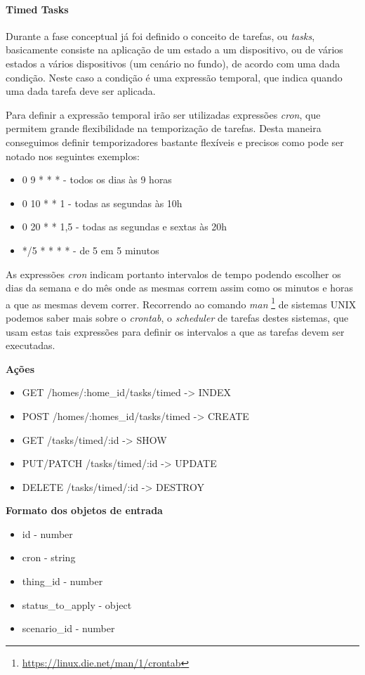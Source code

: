 \paragraph*{Timed Tasks}

Durante a fase conceptual já foi definido o conceito de tarefas, ou \textit{tasks}, basicamente consiste na aplicação de um estado a um dispositivo, ou de vários estados a vários dispositivos (um cenário no fundo), de acordo com uma dada condição. Neste caso a condição é uma expressão temporal, que indica quando uma dada tarefa deve ser aplicada.

Para definir a expressão temporal irão ser utilizadas expressões \textit{cron}, que permitem grande flexibilidade na temporização de tarefas. Desta maneira conseguimos definir temporizadores bastante flexíveis e precisos como pode ser notado nos seguintes exemplos:
\begin{itemize}
    \item 0 9 * * * - todos os dias às 9 horas
    \item 0 10 * * 1 - todas as segundas às 10h
    \item 0 20 * * 1,5 - todas as segundas e sextas às 20h
    \item */5 * * * * - de 5 em 5 minutos
\end{itemize}

As expressões \textit{cron} indicam portanto intervalos de tempo podendo escolher os dias da semana e do mês onde as mesmas correm assim como os minutos e horas a que as mesmas devem correr. Recorrendo ao comando \textit{man} \footnote{\url{https://linux.die.net/man/1/crontab}} de sistemas UNIX podemos saber mais sobre o \textit{crontab}, o \textit{scheduler} de tarefas destes sistemas, que usam estas tais expressões para definir os intervalos a que as tarefas devem ser executadas.

\textbf{Ações}
\begin{itemize}
    \item GET /homes/:home{\_}id/tasks/timed -> INDEX
    \item POST /homes/:homes{\_}id/tasks/timed -> CREATE
    \item GET /tasks/timed/:id -> SHOW
    \item PUT/PATCH /tasks/timed/:id -> UPDATE
    \item DELETE /tasks/timed/:id -> DESTROY
\end{itemize}

\textbf{Formato dos objetos de entrada}
\begin{itemize}
    \item id - number
    \item cron - string
    \item thing{\_}id - number
    \item status{\_}to{\_}apply - object
    \item scenario{\_}id - number
\end{itemize}

